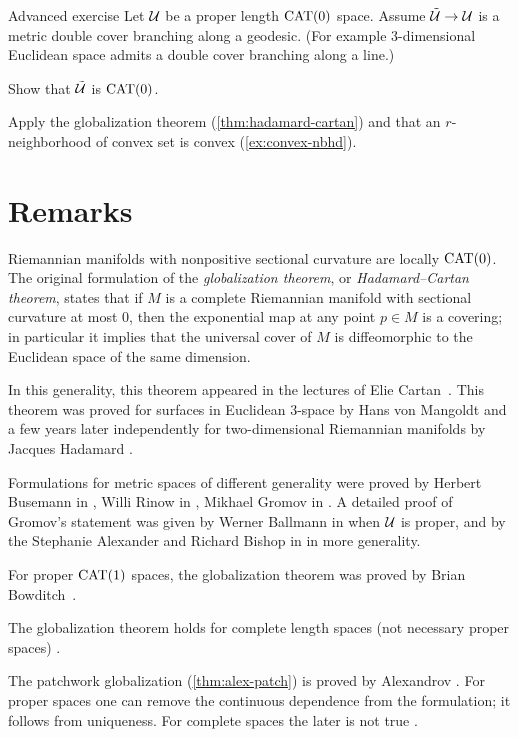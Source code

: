 \begin{thm}{Advanced exercise}\label{ex:branching-cover} 
Let $\mathcal{U}$ be a proper length $\mathrm{CAT}(0)$ space.
Assume $\tilde{\mathcal{U}}\to \mathcal{U}$ is a metric  double cover branching along a geodesic.
(For example 3-dimensional Euclidean space admits a double cover branching along a line.)

Show that $\tilde{\mathcal{U}}$ is $\mathrm{CAT}(0)$.
\end{thm}

 Apply the globalization theorem (\ref{thm:hadamard-cartan}) and that an $r$-neighborhood of convex set is convex (\ref{ex:convex-nbhd}).


\section{Remarks}

Riemannian manifolds with nonpositive sectional curvature are locally $\mathrm{CAT}(0)$.
The original formulation of the 
\emph{globalization theorem}, or 
\emph{Hadamard--Cartan theorem}, states that if $M$ is a complete Riemannian manifold with sectional curvature at most $0$,  
then the exponential map at any point $p\in M$ is a covering;
in particular it implies that the universal cover of $M$ is diffeomorphic to the Euclidean space of the same dimension.

In this generality, this theorem appeared in the lectures of Elie Cartan~\cite{cartan}.
This theorem was proved for surfaces in Euclidean $3$-space 
by Hans von Mangoldt \cite{mangoldt}
and a few years later independently for two-dimensional Riemannian manifolds by Jacques Hadamard \cite{hadamard}.

Formulations for metric spaces of different generality were proved by 
Herbert Busemann in \cite{busemann-CBA},
Willi Rinow in \cite{rinow},
Mikhael Gromov in \cite[p.~119]{gromov-1987}. 
A detailed proof of Gromov's statement was given by Werner Ballmann in \cite{ballmann-1995} when $\mathcal{U}$ is proper,
and by the Stephanie Alexander and Richard Bishop in \cite{alexander-bishop-1990} in more generality.

For proper $\mathrm{CAT}(1)$ spaces, the globalization theorem was proved by Brian Bowditch~\cite{bowditch}.

The globalization theorem holds for complete length spaces (not necessary proper spaces) \cite{alexander-kapovitch-petrunin-2025}.


The patchwork globalization (\ref{thm:alex-patch}) is proved by Alexandrov \cite[Satz 9]{alexandrov-1957}.
For proper spaces one can remove the continuous dependence from the formulation; it follows from uniqueness.
For complete spaces the later is not true \cite[Chapter I, Exercise 3.14]{bridson-haefliger}.

